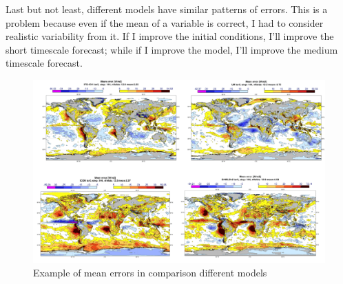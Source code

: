 Last but not least, different models have similar patterns of errors. This is a problem because even if the mean of a variable is correct, I had to consider realistic variability from it. If I improve the initial conditions, I'll improve the short timescale forecast; while if I improve the model, I'll improve the medium timescale forecast.
\begin{figure}[htp!]
	\centering
	\includegraphics[width=0.5\linewidth]{uploads/image7.png}
	\caption{Example of mean errors in comparison different models}
	\label{fig:enter-label}
\end{figure}



